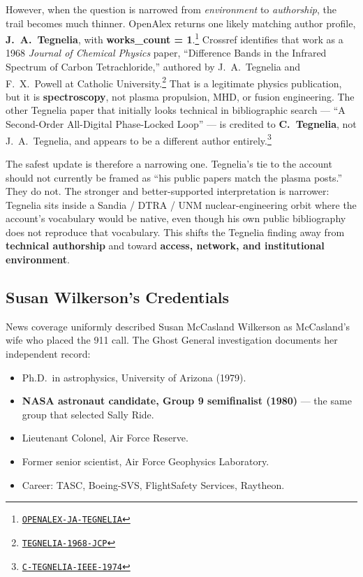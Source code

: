 \documentclass[11pt]{article}
\newcommand{\src}[2]{\href{#1}{\texttt{#2}}}
\begin{document}
However, when the question is narrowed from \emph{environment} to \emph{authorship}, the trail becomes much thinner. OpenAlex returns one likely matching author profile, \textbf{J.\ A.\ Tegnelia}, with \textbf{works\_count = 1}.\footnote{\src{https://api.openalex.org/authors?search=J.\%20A.\%20Tegnelia}{OPENALEX-JA-TEGNELIA}} Crossref identifies that work as a 1968 \textit{Journal of Chemical Physics} paper, ``Difference Bands in the Infrared Spectrum of Carbon Tetrachloride,'' authored by J.\ A.\ Tegnelia and F.\ X.\ Powell at Catholic University.\footnote{\src{https://doi.org/10.1063/1.1669661}{TEGNELIA-1968-JCP}} That is a legitimate physics publication, but it is \textbf{spectroscopy}, not plasma propulsion, MHD, or fusion engineering. The other Tegnelia paper that initially looks technical in bibliographic search --- ``A Second-Order All-Digital Phase-Locked Loop'' --- is credited to \textbf{C.\ Tegnelia}, not J.\ A.\ Tegnelia, and appears to be a different author entirely.\footnote{\src{https://doi.org/10.1109/TCOM.1974.1092067}{C-TEGNELIA-IEEE-1974}}

The safest update is therefore a narrowing one. Tegnelia's tie to the account should not currently be framed as ``his public papers match the plasma posts.'' They do not. The stronger and better-supported interpretation is narrower: Tegnelia sits inside a Sandia / DTRA / UNM nuclear-engineering orbit where the account's vocabulary would be native, even though his own public bibliography does not reproduce that vocabulary. This shifts the Tegnelia finding away from \textbf{technical authorship} and toward \textbf{access, network, and institutional environment}.

\subsection{Susan Wilkerson's Credentials}

News coverage uniformly described Susan McCasland Wilkerson as McCasland's wife who placed the 911 call. The Ghost General investigation documents her independent record:

\begin{itemize}
  \item Ph.D.\ in astrophysics, University of Arizona (1979).
  \item \textbf{NASA astronaut candidate, Group 9 semifinalist (1980)} — the same group that selected Sally Ride.
  \item Lieutenant Colonel, Air Force Reserve.
  \item Former senior scientist, Air Force Geophysics Laboratory.
  \item Career: TASC, Boeing-SVS, FlightSafety Services, Raytheon.
\end{itemize}
\end{document}
